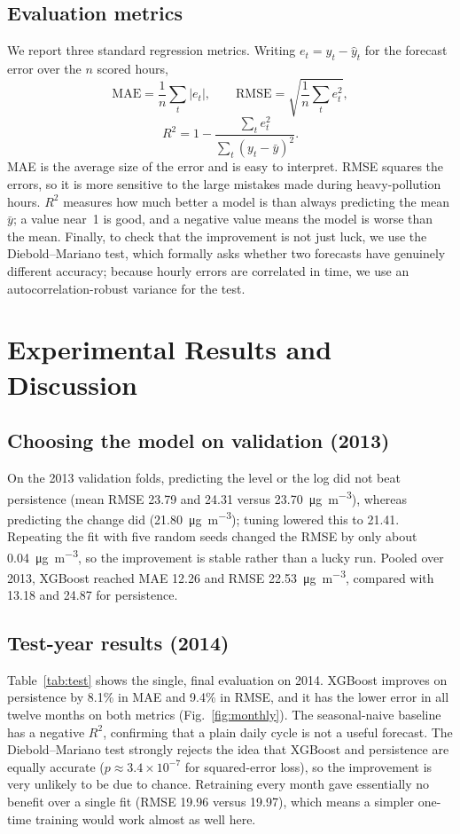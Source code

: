 \documentclass[onecolumn,11pt,journal]{IEEEtran}
\newcommand{\ugm}{\si{\micro\gram\per\cubic\metre}}
\begin{document}
\subsection{Evaluation metrics}
We report three standard regression metrics. Writing $e_t = y_t - \hat{y}_t$ for the forecast error over the $n$ scored hours,
\begin{equation}
\mathrm{MAE} = \frac{1}{n}\sum_t |e_t|, \qquad
\mathrm{RMSE} = \sqrt{\frac{1}{n}\sum_t e_t^2},
\label{eq:maermse}
\end{equation}
\begin{equation}
R^2 = 1 - \frac{\sum_t e_t^2}{\sum_t (y_t-\bar{y})^2}.
\label{eq:r2}
\end{equation}
MAE is the average size of the error and is easy to interpret. RMSE squares the errors, so it is more sensitive to the large mistakes made during heavy-pollution hours. $R^2$ measures how much better a model is than always predicting the mean $\bar{y}$; a value near~1 is good, and a negative value means the model is worse than the mean. Finally, to check that the improvement is not just luck, we use the Diebold--Mariano test, which formally asks whether two forecasts have genuinely different accuracy; because hourly errors are correlated in time, we use an autocorrelation-robust variance for the test.

\section{Experimental Results and Discussion}
\subsection{Choosing the model on validation (2013)}
On the 2013 validation folds, predicting the level or the log did not beat persistence (mean RMSE 23.79 and 24.31 versus 23.70~\ugm{}), whereas predicting the change did (21.80~\ugm{}); tuning lowered this to 21.41. Repeating the fit with five random seeds changed the RMSE by only about 0.04~\ugm{}, so the improvement is stable rather than a lucky run. Pooled over 2013, XGBoost reached MAE 12.26 and RMSE 22.53~\ugm{}, compared with 13.18 and 24.87 for persistence.

\subsection{Test-year results (2014)}
Table~\ref{tab:test} shows the single, final evaluation on 2014. XGBoost improves on persistence by 8.1\% in MAE and 9.4\% in RMSE, and it has the lower error in all twelve months on both metrics (Fig.~\ref{fig:monthly}). The seasonal-naive baseline has a negative $R^2$, confirming that a plain daily cycle is not a useful forecast. The Diebold--Mariano test strongly rejects the idea that XGBoost and persistence are equally accurate ($p \approx 3.4\times10^{-7}$ for squared-error loss), so the improvement is very unlikely to be due to chance. Retraining every month gave essentially no benefit over a single fit (RMSE 19.96 versus 19.97), which means a simpler one-time training would work almost as well here.
\end{document}
